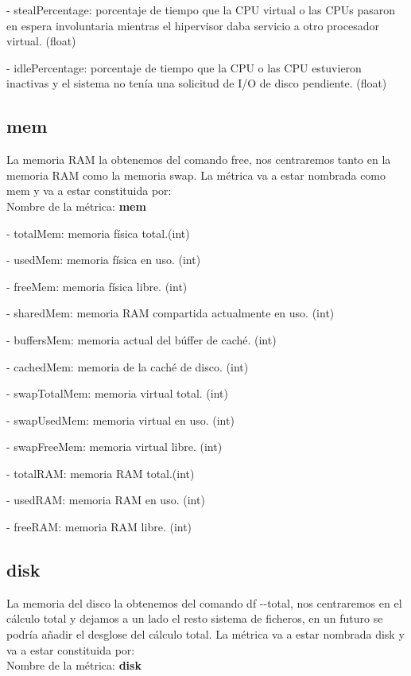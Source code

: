 \documentclass[ spanish, a4paper, 12pt, oneside]{report}
\begin{document}
\hyp{} stealPercentage: porcentaje de tiempo que la CPU virtual o las CPUs pasaron en espera involuntaria mientras el hipervisor daba servicio a otro procesador virtual. (float)

\hyp{} idlePercentage: porcentaje de tiempo que la CPU o las CPU estuvieron inactivas y el sistema no tenía una solicitud de I/O de disco pendiente. (float)

\subsection{mem}
La memoria RAM la obtenemos del comando free, nos centraremos tanto en la memoria RAM
como la memoria swap. La métrica va a estar nombrada como mem y va a estar constituida por:\\

Nombre de la métrica: \textbf{mem}

\hyp{} totalMem: memoria física total.(int)

\hyp{} usedMem: memoria física en uso. (int)

\hyp{} freeMem: memoria física libre. (int)

\hyp{} sharedMem: memoria RAM compartida actualmente en uso. (int)

\hyp{} buffersMem: memoria actual del búffer de caché. (int)

\hyp{} cachedMem: memoria de la caché de disco. (int)

\hyp{} swapTotalMem: memoria virtual total. (int)

\hyp{} swapUsedMem: memoria virtual en uso. (int)

\hyp{} swapFreeMem: memoria virtual libre. (int)

\hyp{} totalRAM: memoria RAM total.(int)

\hyp{} usedRAM: memoria RAM en uso. (int)

\hyp{} freeRAM: memoria RAM libre. (int)

\subsection{disk}
La memoria del disco la obtenemos del comando df \hyp{}\hyp{}total, nos centraremos en el cálculo total y dejamos a un lado el resto 
sistema de ficheros, en un futuro se podría añadir el desglose del cálculo total. La métrica va a estar nombrada disk
y va a estar constituida por:\\
 
Nombre de la métrica: \textbf{disk}
\end{document}
